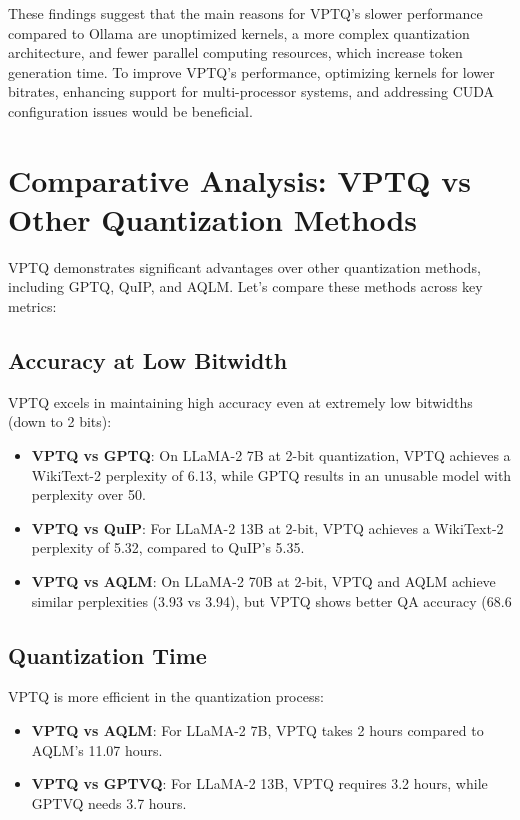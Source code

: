 \documentclass{article}
\begin{document}
These findings suggest that the main reasons for VPTQ's slower performance compared to Ollama are unoptimized kernels, a more complex quantization architecture, and fewer parallel computing resources, which increase token generation time. To improve VPTQ's performance, optimizing kernels for lower bitrates, enhancing support for multi-processor systems, and addressing CUDA configuration issues would be beneficial.

\section{Comparative Analysis: VPTQ vs Other Quantization Methods}

VPTQ demonstrates significant advantages over other quantization methods, including GPTQ, QuIP, and AQLM. Let's compare these methods across key metrics:

\subsection{Accuracy at Low Bitwidth}
VPTQ excels in maintaining high accuracy even at extremely low bitwidths (down to 2 bits):

\begin{itemize}
    \item \textbf{VPTQ vs GPTQ}: On LLaMA-2 7B at 2-bit quantization, VPTQ achieves a WikiText-2 perplexity of 6.13, while GPTQ results in an unusable model with perplexity over 50.
    \item \textbf{VPTQ vs QuIP}: For LLaMA-2 13B at 2-bit, VPTQ achieves a WikiText-2 perplexity of 5.32, compared to QuIP's 5.35.
    \item \textbf{VPTQ vs AQLM}: On LLaMA-2 70B at 2-bit, VPTQ and AQLM achieve similar perplexities (3.93 vs 3.94), but VPTQ shows better QA accuracy (68.6%
\end{itemize}

\subsection{Quantization Time}
VPTQ is more efficient in the quantization process:

\begin{itemize}
    \item \textbf{VPTQ vs AQLM}: For LLaMA-2 7B, VPTQ takes 2 hours compared to AQLM's 11.07 hours.
    \item \textbf{VPTQ vs GPTVQ}: For LLaMA-2 13B, VPTQ requires 3.2 hours, while GPTVQ needs 3.7 hours.
\end{itemize}
\end{document}
